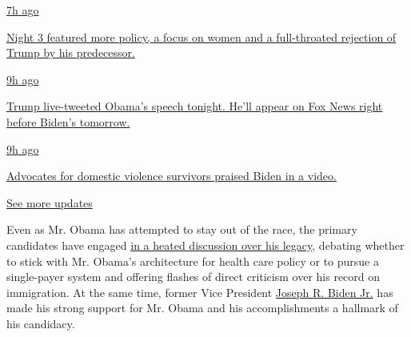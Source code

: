 \href{https://www.nytimes3xbfgragh.onion/live/2020/08/19/us/dnc-convention-election?action=click\&pgtype=Article\&state=default\&region=MAIN_CONTENT_1\&context=storylines_live_updates\#night-3-featured-more-policy-a-focus-on-women-and-a-full-throated-rejection-of-trump-by-his-predecessor}{7h
ago}

\href{https://www.nytimes3xbfgragh.onion/live/2020/08/19/us/dnc-convention-election?action=click\&pgtype=Article\&state=default\&region=MAIN_CONTENT_1\&context=storylines_live_updates\#night-3-featured-more-policy-a-focus-on-women-and-a-full-throated-rejection-of-trump-by-his-predecessor}{Night
3 featured more policy, a focus on women and a full-throated rejection
of Trump by his predecessor.}

\href{https://www.nytimes3xbfgragh.onion/live/2020/08/19/us/dnc-convention-election?action=click\&pgtype=Article\&state=default\&region=MAIN_CONTENT_1\&context=storylines_live_updates\#trump-live-tweeted-obamas-speech-tonight-hell-appear-on-fox-news-right-before-bidens-tomorrow}{9h
ago}

\href{https://www.nytimes3xbfgragh.onion/live/2020/08/19/us/dnc-convention-election?action=click\&pgtype=Article\&state=default\&region=MAIN_CONTENT_1\&context=storylines_live_updates\#trump-live-tweeted-obamas-speech-tonight-hell-appear-on-fox-news-right-before-bidens-tomorrow}{Trump
live-tweeted Obama's speech tonight. He'll appear on Fox News right
before Biden's tomorrow.}

\href{https://www.nytimes3xbfgragh.onion/live/2020/08/19/us/dnc-convention-election?action=click\&pgtype=Article\&state=default\&region=MAIN_CONTENT_1\&context=storylines_live_updates\#advocates-for-domestic-violence-survivors-praised-biden-in-a-video}{9h
ago}

\href{https://www.nytimes3xbfgragh.onion/live/2020/08/19/us/dnc-convention-election?action=click\&pgtype=Article\&state=default\&region=MAIN_CONTENT_1\&context=storylines_live_updates\#advocates-for-domestic-violence-survivors-praised-biden-in-a-video}{Advocates
for domestic violence survivors praised Biden in a video.}

\href{https://www.nytimes3xbfgragh.onion/live/2020/08/19/us/dnc-convention-election?action=click\&pgtype=Article\&state=default\&region=MAIN_CONTENT_1\&context=storylines_live_updates}{See
more updates}

Even as Mr. Obama has attempted to stay out of the race, the primary
candidates have engaged
\href{https://www.nytimes3xbfgragh.onion/2019/09/19/us/politics/barack-obama-democrats-2020.html}{in
a heated discussion over his legacy}, debating whether to stick with Mr.
Obama's architecture for health care policy or to pursue a single-payer
system and offering flashes of direct criticism over his record on
immigration. At the same time, former Vice President
\href{https://www.nytimes3xbfgragh.onion/2019/11/01/us/politics/iowa-poll-warren-biden.html?module=inline}{Joseph
R. Biden Jr.} has made his strong support for Mr. Obama and his
accomplishments a hallmark of his candidacy.

